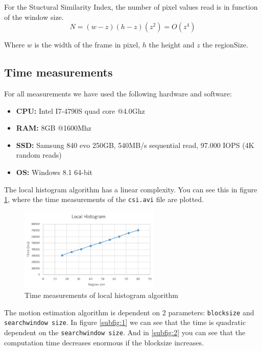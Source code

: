 \documentclass[a4paper,11pt,oneside]{article}
\begin{document}
For the Stuctural Similarity Index, the number of pixel values read is in function of the window size.
\begin{equation}
N = (w-z)(h-z)(z^2) = O(z^4)
\end{equation}\par
Where $w$ is the width of the frame in pixel, $h$ the height and $z$ the regionSize.
\vspace{-0.5cm}
\subsection{Time measurements}
\vspace{-0.5cm}
For all measurements we have used the following hardware and software:
\begin{itemize}
	\item \textbf{CPU:} Intel I7-4790S quad core @4.0Ghz
	\item \textbf{RAM:} 8GB @1600Mhz
	\item \textbf{SSD:} Samsung 840 evo 250GB, 540MB/s sequential read, 97.000 IOPS (4K random reads)
	\item \textbf{OS:} Windows 8.1 64-bit\\
\end{itemize}
The local histogram algorithm has a linear complexity. You can see this in figure \ref{fig:time_LH}, where the time measurements of the \verb!csi.avi! file are plotted.
\begin{figure}[H]
\centering
\includegraphics[width=0.6\textwidth]{img/time_LH.png}
\caption{Time measurements of local histogram algorithm}\label{fig:time_LH}
\end{figure}
The motion estimation algorithm is dependent on 2 parameters: \verb!blocksize! and \verb!searchwindow size!. In figure \ref{subfig:1} we can see that the time is quadratic dependent on the \verb!searchwindow size!. And in \ref{subfig:2} you can see that the computation time decreases enormous if the blocksize increases.
\end{document}
